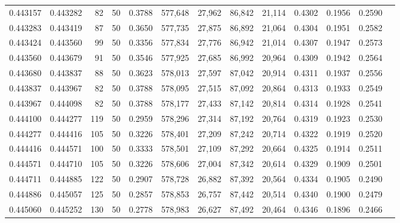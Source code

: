 \begin{tabular}{rrrrrrrrrrrrr}
0.443157 & 0.443282 &    82 &  50 &                                     0.3788 & 577,648 &  27,962 &  86,842 &  21,114 & 0.4302 & 0.1956 & 0.2590 \\
0.443283 & 0.443419 &    87 &  50 &                                     0.3650 & 577,735 &  27,875 &  86,892 &  21,064 & 0.4304 & 0.1951 & 0.2582 \\
0.443424 & 0.443560 &    99 &  50 &                                     0.3356 & 577,834 &  27,776 &  86,942 &  21,014 & 0.4307 & 0.1947 & 0.2573 \\
0.443560 & 0.443679 &    91 &  50 &                                     0.3546 & 577,925 &  27,685 &  86,992 &  20,964 & 0.4309 & 0.1942 & 0.2564 \\
0.443680 & 0.443837 &    88 &  50 &                                     0.3623 & 578,013 &  27,597 &  87,042 &  20,914 & 0.4311 & 0.1937 & 0.2556 \\
0.443837 & 0.443967 &    82 &  50 &                                     0.3788 & 578,095 &  27,515 &  87,092 &  20,864 & 0.4313 & 0.1933 & 0.2549 \\
0.443967 & 0.444098 &    82 &  50 &                                     0.3788 & 578,177 &  27,433 &  87,142 &  20,814 & 0.4314 & 0.1928 & 0.2541 \\
0.444100 & 0.444277 &   119 &  50 &                                     0.2959 & 578,296 &  27,314 &  87,192 &  20,764 & 0.4319 & 0.1923 & 0.2530 \\
0.444277 & 0.444416 &   105 &  50 &                                     0.3226 & 578,401 &  27,209 &  87,242 &  20,714 & 0.4322 & 0.1919 & 0.2520 \\
0.444416 & 0.444571 &   100 &  50 &                                     0.3333 & 578,501 &  27,109 &  87,292 &  20,664 & 0.4325 & 0.1914 & 0.2511 \\
0.444571 & 0.444710 &   105 &  50 &                                     0.3226 & 578,606 &  27,004 &  87,342 &  20,614 & 0.4329 & 0.1909 & 0.2501 \\
0.444711 & 0.444885 &   122 &  50 &                                     0.2907 & 578,728 &  26,882 &  87,392 &  20,564 & 0.4334 & 0.1905 & 0.2490 \\
0.444886 & 0.445057 &   125 &  50 &                                     0.2857 & 578,853 &  26,757 &  87,442 &  20,514 & 0.4340 & 0.1900 & 0.2479 \\
0.445060 & 0.445252 &   130 &  50 &                                     0.2778 & 578,983 &  26,627 &  87,492 &  20,464 & 0.4346 & 0.1896 & 0.2466 \\

\end{tabular}
